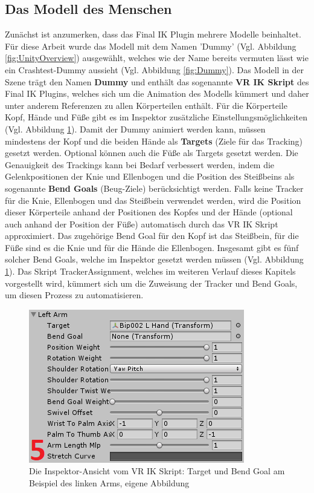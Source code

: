 \subsection{Das Modell des Menschen}\label{sec:MMModell}
Zunächst ist anzumerken, dass das Final IK Plugin mehrere Modelle beinhaltet. Für diese Arbeit wurde das Modell mit dem Namen 'Dummy' (Vgl. Abbildung \ref{fig:UnityOverview}) ausgewählt, welches wie der Name bereits vermuten lässt wie ein Crashtest-Dummy aussieht (Vgl. Abbildung \ref{fig:Dummy}).
\newline
Das Modell in der Szene trägt den Namen \textbf{Dummy} und enthält das sogenannte \textbf{VR IK Skript} des Final IK Plugins, welches sich um die Animation des Modells kümmert und daher unter anderem Referenzen zu allen Körperteilen enthält. Für die Körperteile Kopf, Hände und Füße gibt es im Inspektor zusätzliche Einstellungsmöglichkeiten (Vgl. Abbildung \ref{fig:TargetBendGoal}). Damit der Dummy animiert werden kann, müssen mindestens der Kopf und die beiden Hände als \textbf{Targets} (Ziele für das Tracking) gesetzt werden. Optional können auch die Füße als Targets gesetzt werden. 
Die Genauigkeit des Trackings kann bei Bedarf verbessert werden, indem die Gelenkpositionen der Knie und Ellenbogen und die Position des Steißbeins als sogenannte \textbf{Bend Goals} (Beug-Ziele) berücksichtigt werden. Falls keine Tracker für die Knie, Ellenbogen und das Steißbein verwendet werden, wird die Position dieser Körperteile anhand der Positionen des Kopfes und der Hände (optional auch anhand der Position der Füße) automatisch durch das VR IK Skript approximiert.
Das zugehörige Bend Goal für den Kopf ist das Steißbein, für die Füße sind es die Knie und für die Hände die Ellenbogen. Insgesamt gibt es fünf solcher Bend Goals, welche im Inspektor gesetzt werden müssen (Vgl. Abbildung \ref{fig:TargetBendGoal}).
Das Skript TrackerAssignment, welches im weiteren Verlauf dieses Kapitels vorgestellt wird, kümmert sich um die Zuweisung der Tracker und Bend Goals, um diesen Prozess zu automatisieren.
\begin{figure}[h]
	\centering
	\includegraphics[width=0.35\linewidth]{Bilder/A36_TargetsBendGoals2}
	\caption{Die Inspektor-Ansicht vom VR IK Skript: Target und Bend Goal am Beispiel des linken Arms, eigene Abbildung}
	\label{fig:TargetBendGoal}
\end{figure}

